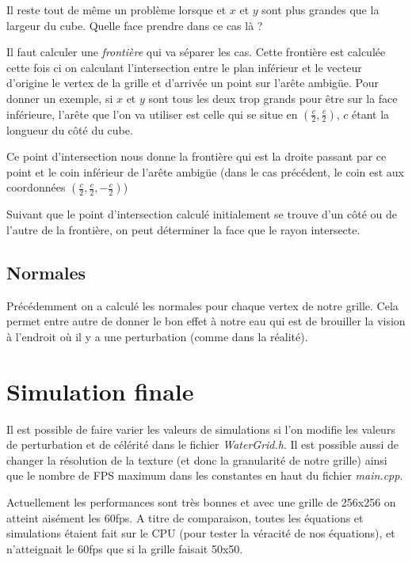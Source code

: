 \documentclass[a4paper,11pt,leqno]{article}
\begin{document}
Il reste tout de même un problème lorsque et $x$ et $y$ sont plus grandes que la largeur du cube. Quelle face prendre dans ce cas là ?

Il faut calculer une \emph{frontière} qui va séparer les cas. Cette frontière est calculée cette fois ci on calculant l'intersection entre le plan inférieur et le vecteur d'origine le vertex de la grille et d'arrivée un point sur l'arête ambigüe. Pour donner un exemple, si $x$ et $y$ sont tous les deux trop grands pour être sur la face inférieure, l'arête que l'on va utiliser est celle qui se situe en $(\frac{c}{2}, \frac{c}{2})$, $c$ étant la longueur du côté du cube.

Ce point d'intersection nous donne la frontière qui est la droite passant par ce point et le coin inférieur de l'arête ambigüe (dans le cas précédent, le coin est aux coordonnées $(\frac{c}{2}, \frac{c}{2}, -\frac{c}{2})$)

Suivant que le point d'intersection calculé initialement se trouve d'un côté ou de l'autre de la frontière, on peut déterminer la face que le rayon intersecte.

\subsection{Normales}

Précédemment on a calculé les normales pour chaque vertex de notre grille. Cela permet entre autre de donner le bon effet à notre eau qui est de brouiller la vision à l'endroit où il y a une perturbation (comme dans la réalité).

\section{Simulation finale}

Il est possible de faire varier les valeurs de simulations si l'on modifie les valeurs de perturbation et de célérité dans le fichier \emph{WaterGrid.h}. Il est possible aussi de changer la résolution de la texture (et donc la granularité de notre grille) ainsi que le nombre de FPS maximum dans les constantes en haut du fichier \emph{main.cpp}.

Actuellement les performances sont très bonnes et avec une grille de 256x256 on atteint aisément les 60fps. 
A titre de comparaison, toutes les équations et simulations étaient fait sur le CPU (pour tester la véracité de nos équations), et n'atteignait le 60fps que si la grille faisait 50x50.
\end{document}
